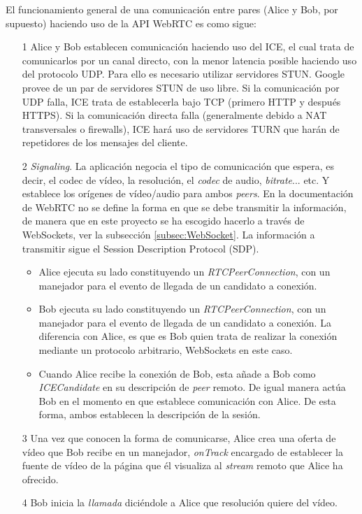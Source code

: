 El funcionamiento general de una comunicación entre pares (Alice y Bob, por supuesto) haciendo uso de la API WebRTC es como sigue: 
\begin{itemize}
\item[1] Alice y Bob establecen comunicación haciendo uso del ICE, el cual trata de comunicarlos por un canal directo, con la menor latencia posible haciendo uso del protocolo UDP. Para ello es necesario utilizar servidores STUN. Google provee de un par de servidores STUN de uso libre. Si la comunicación por UDP falla, ICE trata de establecerla bajo TCP (primero HTTP y después HTTPS). Si la comunicación directa falla (generalmente debido a NAT transversales o firewalls), ICE hará uso de servidores TURN que harán de repetidores de los mensajes del cliente.
\item[2] \emph{Signaling}. La aplicación negocia el tipo de comunicación que espera, es decir, el codec de vídeo, la resolución, el \emph{codec} de audio, \emph{bitrate}... etc. Y establece los orígenes de vídeo/audio para ambos \emph{peers}. En la documentación de WebRTC no se define la forma en que se debe transmitir la información, de manera que en este proyecto se ha escogido hacerlo a través de WebSockets, ver la subsección \ref{subsec:WebSocket}. La información a transmitir sigue el Session Description Protocol (SDP).

\begin{itemize}
\item Alice ejecuta su lado constituyendo un \textit{RTCPeerConnection}, con un manejador para el evento de llegada de un candidato a conexión.
\item Bob ejecuta su lado constituyendo un \textit{RTCPeerConnection}, con un manejador para el evento de llegada de un candidato a conexión. La diferencia con Alice, es que es Bob quien trata de realizar la conexión mediante un protocolo arbitrario, WebSockets en este caso. 
\item Cuando Alice recibe la conexión de Bob, esta añade a Bob como \emph{ICECandidate} en su descripción de \emph{peer} remoto. De igual manera actúa Bob en el momento en que establece comunicación con Alice. De esta forma, ambos establecen la descripción de la sesión.
\end{itemize}
\item[3] Una vez que conocen la forma de comunicarse, Alice crea una oferta de vídeo que Bob recibe en un manejador, \emph{onTrack} encargado de establecer la fuente de vídeo de la página que él visualiza al \emph{stream} remoto que Alice ha ofrecido.
\item[4] Bob inicia la \textit{llamada} diciéndole a Alice que resolución quiere del vídeo.
\end{itemize}

